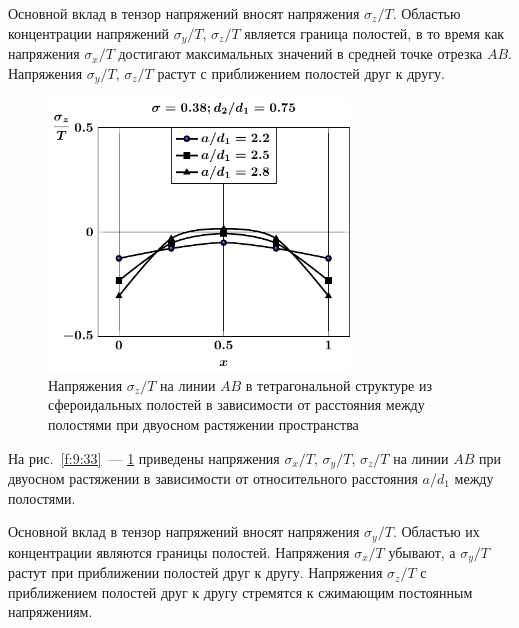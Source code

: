 Основной вклад в тензор напряжений вносят напряжения $\sigma_z/T$. Областью концентрации напряжений $\sigma_y/T$, $\sigma_z/T$ является граница полостей, в то время как напряжения $\sigma_x/T$ достигают максимальных значений в средней точке отрезка $AB$. Напряжения $\sigma_y/T$, $\sigma_z/T$ растут с приближением полостей друг к другу.

\begin{figure}[h!]
\centering
\includegraphics[width=8cm]{cav8-a-d75-t2-sig_z-ab.pdf}
\caption{Напряжения $\sigma_z/T$ на линии $AB$ в тетрагональной структуре из сфероидальных полостей в зависимости от расстояния между полостями при двуосном растяжении пространства}
\label{f:9:35}
\end{figure}

На рис.~\ref{f:9:33}~--- \ref{f:9:35} приведены напряжения $\sigma_x/T$, $\sigma_y/T$, $\sigma_z/T$ на линии $AB$ при двуосном растяжении в зависимости от относительного расстояния $a/d_1$ между полостями.

Основной вклад в тензор напряжений вносят напряжения $\sigma_y/T$. Областью их концентрации являются границы полостей. Напряжения $\sigma_x/T$ убывают, а $\sigma_y/T$ растут при приближении полостей друг к другу. Напряжения $\sigma_z/T$ с приближением полостей друг к другу стремятся к сжимающим постоянным напряжениям.

%

